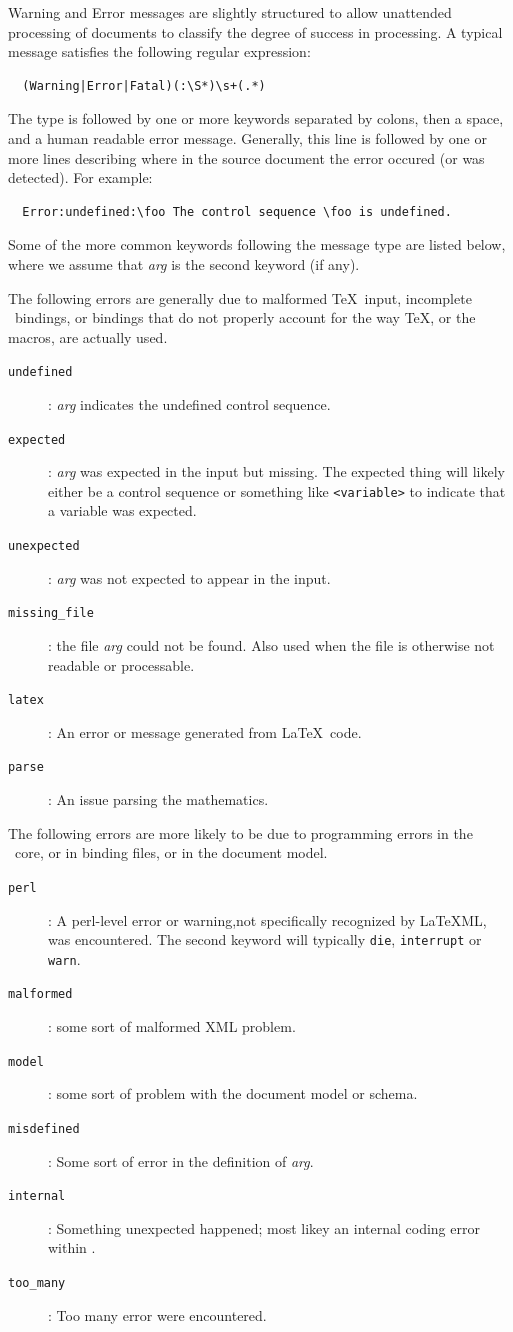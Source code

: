 \documentclass{book}
\begin{document}
Warning and Error messages are slightly structured to allow
unattended processing of documents to classify the degree
of success in processing. A typical message satisfies the following regular expression:
\begin{verbatim}
  (Warning|Error|Fatal)(:\S*)\s+(.*)
\end{verbatim}
The type is followed by one or more keywords separated by colons,
then a space, and a human readable error message.
Generally, this line is followed by one or more lines describing
where in the source document the error occured (or was detected).
For example:
\begin{verbatim}
  Error:undefined:\foo The control sequence \foo is undefined.
\end{verbatim}

Some of the more common keywords following the message type are listed below,
where we assume that \textit{arg} is the second keyword (if any).

The following errors are generally due to malformed \TeX\ input, 
incomplete \LaTeXML\ bindings, or bindings that
do not properly account for the way \TeX, or the macros, are actually used.
\begin{description}
\item[\texttt{undefined}]: \textit{arg} indicates the undefined control sequence.
\item[\texttt{expected}]: \textit{arg} was expected in the input but missing.
 The expected thing will likely either be a control sequence or something like
 \verb|<variable>| to indicate that a variable was expected.
\item[\texttt{unexpected}]: \textit{arg} was not expected to appear in the input.
\item[\texttt{missing\_file}]: the file \textit{arg} could not be found.
  Also used when the file is otherwise not readable or processable.
\item[\texttt{latex}]: An error or message generated from \LaTeX\ code.
\item[\texttt{parse}]: An issue parsing the mathematics.
\end{description}

The following errors are more likely to be due to programming errors in the
\LaTeXML\ core, or in binding files, or in the document model.
\begin{description}
\item[\texttt{perl}]: A perl-level error or warning,not specifically recognized
 by LaTeXML, was encountered.
The second keyword will typically \texttt{die}, \texttt{interrupt} or \texttt{warn}.
\item[\texttt{malformed}]: some sort of malformed XML problem.
\item[\texttt{model}]: some sort of problem with the document model or schema.
\item[\texttt{misdefined}]: Some sort of error in the definition of \textit{arg}.
\item[\texttt{internal}]: Something unexpected happened; most likey an
internal coding error within \LaTeXML.
\item[\texttt{too\_many}]: Too many error were encountered.
\end{description}
\end{document}
